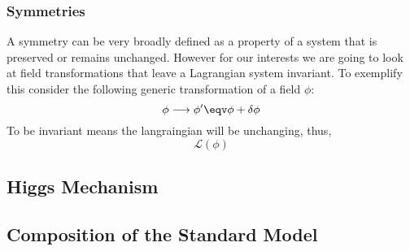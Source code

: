 \subsubsection{ Symmetries }

A symmetry can be very broadly defined as a property of a system that is preserved or remains unchanged. However for our interests we are going to look at field transformations that leave a Lagrangian system invariant. To exemplify this consider the following generic transformation of a field $\phi$:
\begin{equation}
\phi \longrightarrow \phi^\prime \eqv \phi + \delta \phi 
\end{equation} 
To be invariant means the langraingian will be unchanging, thus, 
\begin{equation}
\mathcal{L}(\phi) 
\end{equation}



\subsection{Higgs Mechanism}

\subsection{Composition of the Standard Model}


